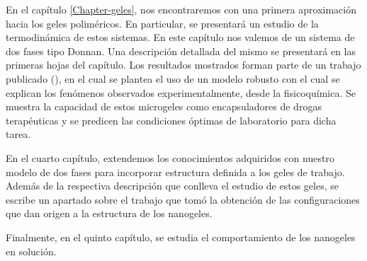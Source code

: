 En el cap\'itulo \ref{Chapter-geles}, nos encontraremos con una primera aproximaci\'on hacia los geles polim\'ericos. En particular, se presentará un estudio de la termodin\'amica de estos sistemas. En este cap\'itulo nos valemos de un sistema de dos fases tipo Donnan. Una descripci\'on detallada del mismo se presentar\'a en las primeras hojas del cap\'itulo. Los resultados mostrados forman parte de un trabajo publicado (\addcite[macromolecules]), en el cual se plantea el uso de un modelo robusto con el cual se explican los fen\'omenos observados experimentalmente, desde la fisicoqu\'imica. Se muestra la capacidad de estos microgeles como encapsuladores de drogas terap\'euticas y se predicen las condiciones \'optimas de laboratorio para dicha tarea.

En el cuarto cap\'itulo, extendemos los conocimientos adquiridos con nuestro modelo de dos fases para incorporar estructura definida a los geles de trabajo. Adem\'as de la respectiva descripci\'on que conlleva el estudio de estos geles, se escribe un apartado sobre el trabajo que tom\'o la obtenci\'on de las configuraciones que dan origen a la estructura de los nanogeles.

Finalmente, en el quinto cap\'itulo, se estudia el comportamiento de los nanogeles en soluci\'on.



